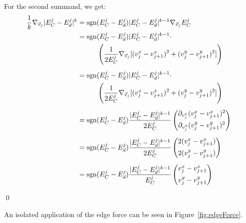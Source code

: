 \begin{proposition}
	For the second summand, we get:
	\begin{align*}
		\frac{1}{k} \nabla_{\vec{v}_{j}} |E^{j}_{C} - E^{j}_d|^k 
		&= \operatorname{sgn}(E^{j}_C - E^{j}_d) |E^{j}_C - E^{j}_d|^{k-1} \nabla_{\vec{v}_j} E^{j}_C \\
		&= \operatorname{sgn}(E^{j}_C - E^{j}_d) |E^{j}_C - E^{j}_d|^{k-1} \cdot   \\
		& \hspace{1cm} \left(\frac{1}{2 E^{j}_C} \nabla_{\vec{v}_j} [(v_{j}^{x} - v_{j+1}^{x})^2 + (v_{j}^{y} - v_{j+1}^{y})^2]\right) \\[0.5em] 
		&= \operatorname{sgn}(E^{j}_C - E^{j}_d) |E^{j}_C - E^{j}_d|^{k-1} \cdot   \\
		& \hspace{1cm} \left(\frac{1}{2 E^{j}_C} \nabla_{\vec{v}_j} [(v_{j}^{x} - v_{j+1}^{x})^2 + (v_{j}^{y} - v_{j+1}^{y})^2]\right) \\[0.5em] 
		&= \operatorname{sgn}(E^{j}_C - E^{j}_d) \frac{|E^{j}_C - E^{j}_d|^{k-1}}{2 E^{j}_C} \begin{pmatrix}
			\partial_{v_{j}^{x}} (v_{j}^{x} - v_{j+1}^{x})^2 \\[0.5em]
			\partial_{v_{j}^{y}} (v_{j}^{y} - v_{j+1}^{y})^2
		\end{pmatrix} \\[0.5em]
		&= \operatorname{sgn}(E^{j}_C - E^{j}_d) \frac{|E^{j}_C - E^{j}_d|^{k-1}}{2 E^{j}_C} \begin{pmatrix}
			2(v_{j}^{x} - v_{j+1}^{x}) \\[0.5em]
			2(v_{j}^{y} - v_{j+1}^{y})
		\end{pmatrix} \\[0.5em]
		&= \operatorname{sgn}(E^{j}_C - E^{j}_d) \frac{ |E^{j}_C - E^{j}_d|^{k-1}}{E^{j}_C} \begin{pmatrix}
				v_{j}^{x} - v_{j+1}^{x} \\[0.5em]
				v_{j}^{y} - v_{j+1}^{y}
		\end{pmatrix}
	\end{align*}
	
	\qed  
\end{proposition}

An isolated application of the edge force can be seen in Figure~\ref{fig:edgeForce}.  

